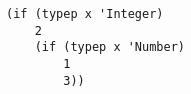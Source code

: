 \begin{lstlisting}[style=reclojureClojure]
(if (typep x 'Integer)
    2
    (if (typep x 'Number)
        1
        3))
\end{lstlisting}

